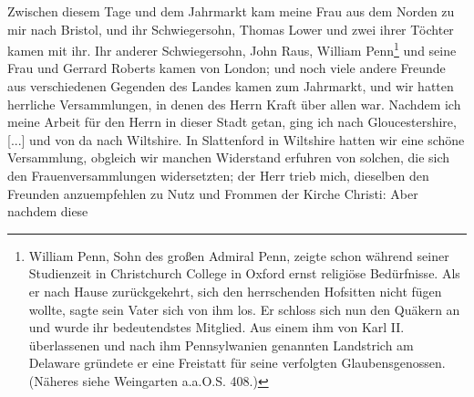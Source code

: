 Zwischen diesem Tage und dem Jahrmarkt kam meine Frau
aus dem Norden zu mir nach Bristol, und ihr Schwiegersohn,
Thomas Lower und zwei ihrer Töchter kamen mit ihr. Ihr
anderer Schwiegersohn, John Raus, William Penn\footnote{
William Penn, Sohn des großen Admiral Penn, zeigte schon während
seiner Studienzeit in Christchurch College 
in Oxford ernst religiöse Bedürfnisse.
Als er nach Hause zurückgekehrt, sich den herrschenden Hofsitten nicht fügen wollte,
sagte sein Vater sich von ihm los. Er schloss sich nun den Quäkern an und
wurde ihr bedeutendstes Mitglied. Aus einem ihm von Karl II. überlassenen
und nach ihm Pennsylwanien genannten Landstrich am Delaware gründete er
eine Freistatt für seine verfolgten Glaubensgenossen. (Näheres siehe Weingarten
a.a.O.S. 408.)
} und seine
Frau und Gerrard Roberts kamen von London; und noch viele
andere Freunde aus verschiedenen Gegenden des Landes kamen
zum Jahrmarkt, und wir hatten herrliche Versammlungen, in
denen des Herrn Kraft über allen war. Nachdem ich meine
Arbeit für den Herrn in dieser Stadt getan, ging ich nach 
Gloucestershire, [...] und von da nach Wiltshire. 
In Slattenford in Wiltshire hatten wir eine schöne Versammlung, obgleich wir
manchen Widerstand erfuhren von solchen, die sich den 
Frauenversammlungen widersetzten; der Herr 
trieb mich, dieselben den
Freunden anzuempfehlen zu Nutz und Frommen der Kirche Christi:
 Aber nachdem diese
